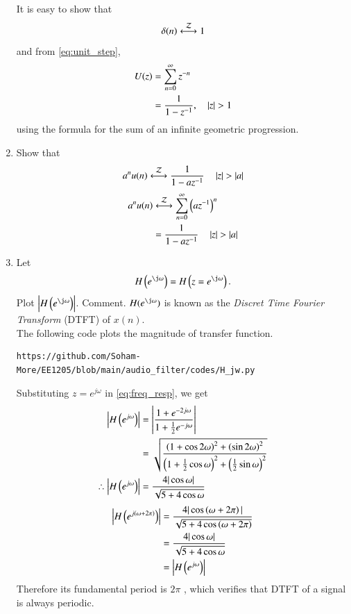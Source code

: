 \documentclass[journal,12pt,twocolumn]{IEEEtran}
\theoremstyle{remark}
\begin{document}
\begin{enumerate}[label=\thesection.\arabic*]
\solution It is easy to show that
\begin{equation}
\delta(n) \system{Z} 1
\end{equation}
and from \eqref{eq:unit_step},
\begin{align}
U(z) &= \sum _{n= 0}^{\infty}z^{-n}
\\
&=\frac{1}{1-z^{-1}}, \quad \left\vert z\right\vert > 1
\end{align}
using the formula for the sum of an infinite geometric progression.

\item Show that 
\begin{equation}
    a^nu(n) \system{Z} \frac{1}{1-az^{-1}} \quad \abs{z} > \abs{a} \label{eq:anun}
\end{equation}
\solution 
\begin{align}
	a^nu(n) &\system{Z} \sum_{n = 0}^{\infty}\brak{az^{-1}}^n \\
			&= \frac{1}{1-az^{-1}} \quad \abs{z} > \abs{a}
\end{align}

\item 
Let
\begin{equation}
    H\brak{e^{\j \omega}} = H\brak{z = e^{\j \omega}}.
\end{equation}
Plot $\abs{H\brak{e^{\j \omega}}}$.  Comment.  $H(e^{\j \omega})$ is known as the {\em Discret Time Fourier Transform} (DTFT) of $x(n)$.\\

\solution The following code plots the magnitude of transfer function.
\begin{lstlisting}
https://github.com/Soham-More/EE1205/blob/main/audio_filter/codes/H_jw.py
\end{lstlisting}
Substituting $z = e^{j \omega}$ in \eqref{eq:freq_resp}, we get
\begin{align}
	\left\vert H\left(e^{j\omega}\right)\right\vert &= \left\vert\frac{1 + e^{-2j\omega}}{1 + \frac{1}{2}e^{-j\omega}}\right\vert \\
	&= \sqrt{\frac{\left(1 + \cos{2\omega}\right)^2 + \left(\sin{2\omega}\right)^2}{\left(1 + \frac{1}{2}\cos{\omega}\right)^2 + \left(\frac{1}{2}\sin{\omega}\right)^2}}\\
	\therefore \left\vert H\left(e^{j\omega}\right)\right\vert &= \frac{4|\cos{\omega}|}{\sqrt{5 + 4\cos{\omega}}}
\end{align}
\begin{align}
	\left\vert H\left(e^{j\left(\omega + 2\pi\right)}\right)\right\vert &= \frac{4|\cos\left(\omega + 2\pi\right)|}{\sqrt{5 + 4\cos\left(\omega + 2\pi\right)}} \\
	&= \frac{4|\cos{\omega}|}{\sqrt{5 + 4\cos{\omega}}} \\
	&= \left\vert H\left(e^{j\omega}\right)\right\vert	
\end{align}
Therefore its fundamental period is $2\pi$ , which verifies that DTFT of a signal is always periodic.


\end{enumerate}
\end{document}
